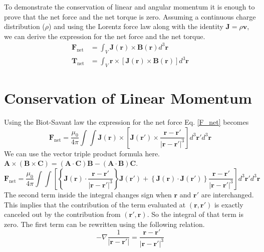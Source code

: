 \documentclass[titlepage, a4paper, 11pt]{article}
\begin{document}
To demonstrate the conservation of linear and angular momentum it is enough to prove that the net
force and the net torque is zero. Assuming a continuous charge distribution ($\rho$) and using the
Lorentz force law along with the identity $\mathbf{J} = \rho \mathbf{v}$, we can derive the
expression for the net force\cite{Griffiths} and the net torque.
\begin{align}
	\mathbf{F}_\text{net} &= \int_V \mathbf{J}(\mathbf{r}) \times \mathbf{B}(\mathbf{r}) d^3\mathbf{r}
	\label{F_net} \\
	\mathbf{T}_\text{net} &= \int_V \mathbf{r} \times \left[ \mathbf{J}(\mathbf{r}) \times
	\mathbf{B}(\mathbf{r}) \right] d^3 \mathbf{r}
	\label{T_net}
\end{align}

\section{Conservation of Linear Momentum}
Using the Biot-Savant law the expression for the net force Eq. \eqref{F_net}
becomes
\begin{equation}
	\mathbf{F}_\text{net} = \frac{\mu_0}{4\pi} \int \int \mathbf{J}(\mathbf{r}) \times \left[
	\mathbf{J}(\mathbf{r}') \times \frac{\mathbf{r} - \mathbf{r}'}{| \mathbf{r} - \mathbf{r}'
	|^3} \right] d^3\mathbf{r}' d^3\mathbf{r}
\end{equation}
We can use the vector triple product formula here. $\mathbf{A} \times (\mathbf{B} \times \mathbf{C})
= (\mathbf{A} \cdot \mathbf{C}) \mathbf{B} - (\mathbf{A} \cdot \mathbf{B}) \mathbf{C}$.
\begin{equation}
	\mathbf{F}_\text{net} = \frac{\mu_0}{4\pi} \int \int \left[ \left\{ \mathbf{J}(\mathbf{r}) \cdot
	\frac{\mathbf{r} - \mathbf{r}'}{| \mathbf{r} - \mathbf{r}' |^3} \right\} \mathbf{J}(\mathbf{r}')
	+ \left\{ \mathbf{J}(\mathbf{r}) \cdot \mathbf{J}(\mathbf{r}') \right\} \frac{\mathbf{r} -
	\mathbf{r}'}{| \mathbf{r} - \mathbf{r}' |^3} \right] d^3\mathbf{r}' d^3\mathbf{r}
\end{equation}
The  second term inside the integral changes sign when $\mathbf{r}$ and $\mathbf{r}'$ are
interchanged. This implies that the contribution of the term evaluated at $(\mathbf{r},
\mathbf{r}')$ is exactly canceled out by the contribution from $(\mathbf{r}', \mathbf{r})$. So the
integral of that term is zero. The first term can be rewritten using the following relation.
\begin{equation}
	- \nabla \frac{1}{|\mathbf{r} - \mathbf{r}'|} = \frac{\mathbf{r} - \mathbf{r}'}{| \mathbf{r} -
	\mathbf{r}' |^3}
	\label{grad 1/r}
\end{equation}
\end{document}
